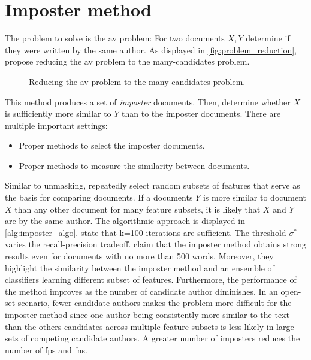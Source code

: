 \section{Imposter method}
\label{sec:imposter_method}

The problem to solve is the \ac{av} problem:
For two documents $X, Y$ determine if they were written by the same author.
As displayed in \autoref{fig:problem_reduction}, \citet{koppel_determining_2014} propose reducing the \ac{av} problem to the many-candidates problem.

\begin{figure}[htbp]
    \centering
    
    \caption{Reducing the \ac{av} problem to the many-candidates problem.}
    \label{fig:problem_reduction}
\end{figure}

This method produces a set of \textit{imposter} documents.
Then, \citet{koppel_determining_2014} determine whether $X$ is sufficiently more similar to $Y$ than to the imposter documents.
There are multiple important settings:
\begin{itemize}
    \item Proper methods to select the imposter documents.
    \item Proper methods to measure the similarity between documents.
\end{itemize}
Similar to unmasking, \citet{koppel_determining_2014} repeatedly select random subsets of features that serve as the basis for comparing documents.
If a documents $Y$ is more similar to document $X$ than any other document for many feature subsets, 
it is likely that $X$ and $Y$ are by the same author.
The algorithmic approach is displayed in \autoref{alg:imposter_algo}.
\citet{koppel_determining_2014} state that k=100 iterations are sufficient.
The threshold $\sigma^*$ varies the recall-precision tradeoff.
\citet{koppel_determining_2014} claim that the imposter method obtains strong results even for documents with no more than 500 words.
Moreover, they highlight the similarity between the imposter method and an ensemble of classifiers learning different subset of features.
Furthermore, the performance of the method improves as the number of candidate author diminishes.
In an open-set scenario, fewer candidate authors makes the problem more difficult for the imposter method 
since one author being consistently more similar to the text than the others candidates across multiple feature subsets is less likely in large sets of competing candidate authors.
A greater number of imposters reduces the number of \acp{fp} and \acp{fn}.

